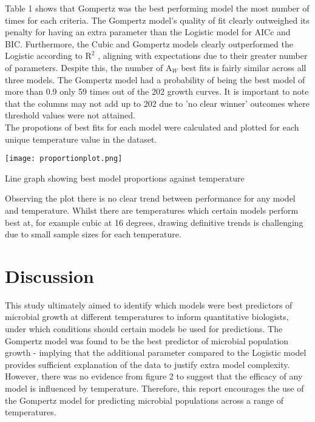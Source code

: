 \documentclass[12pt]{article}
\begin{document}
Table 1 shows that Gompertz was the best performing model the most number of times for each criteria. The Gompertz model's quality of fit clearly outweighed its penalty for having an extra parameter than the Logistic model for AICc and BIC. Furthermore, the Cubic and Gompertz models clearly outperformed the Logistic according to $\mathrm{R}^2$ , aligning with expectations due to their greater number of parameters. Despite this, the number of $\mathrm{A}_{\textit{W}}$ best fits is fairly similar across all three models. The Gompertz model had a probability of being the best model of more than 0.9 only 59 times out of the 202 growth curves. It is important to note that the columns may not add up to 202 due to 'no clear winner' outcomes where threshold values were not attained.\\

The propotions of best fits for each model were calculated and plotted for each unique temperature value in the dataset. 
  \begin{center}
    \texttt{[image: proportionplot.png]} 
    \caption{Line graph showing best model proportions against temperature}
  \end{center}
Observing the plot there is no clear trend between performance for any model and temperature. Whilst there are temperatures which certain models perform best at, for example cubic at 16 degrees, drawing definitive trends is challenging due to small sample sizes for each temperature.

\section{Discussion}

This study ultimately aimed to identify which models were best predictors of microbial growth at different temperatures to inform quantitative biologists, under which conditions should certain models be used for predictions. The Gompertz model was found to be the best predictor of microbial population growth - implying that the additional parameter compared to the Logistic model provides sufficient explanation of the data to justify extra model complexity. However, there was no evidence from figure 2 to suggest that the efficacy of any model is influenced by temperature. Therefore, this report encourages the use of the Gompertz model for predicting microbial populations across a range of temperatures.\\
\end{document}
